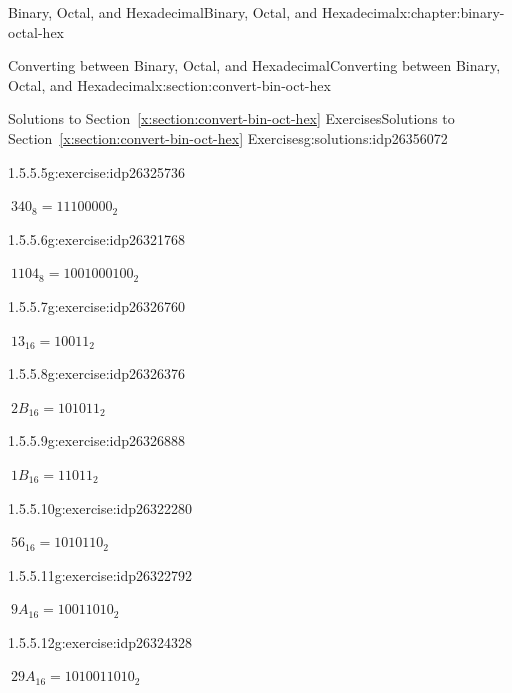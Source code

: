 \documentclass[twoside,10pt,]{book}
\newcommand{\xreffont}{\relax}
\numberwithin{equation}{section}
\begin{document}
\begin{chapterptx}{Binary, Octal, and Hexadecimal}{}{Binary, Octal, and Hexadecimal}{}{}{x:chapter:binary-octal-hex}
\begin{sectionptx}{Converting between Binary, Octal, and Hexadecimal}{}{Converting between Binary, Octal, and Hexadecimal}{}{}{x:section:convert-bin-oct-hex}
\begin{solutions-subsection}{Solutions to Section~{\xreffont\ref*{x:section:convert-bin-oct-hex}} Exercises}{}{Solutions to Section~{\xreffont\ref*{x:section:convert-bin-oct-hex}} Exercises}{}{}{g:solutions:idp26356072}
\begin{exercisegroup}
\begin{divisionsolutioneg}{1.5.5.5}{}{g:exercise:idp26325736}
\par\smallskip%
\noindent\hypertarget{g:solution:idp26320104-main}{}\(\ 340_8=11100000_2\)\end{divisionsolutioneg}%
\begin{divisionsolutioneg}{1.5.5.6}{}{g:exercise:idp26321768}%
\par\smallskip%
\noindent\hypertarget{g:solution:idp26325480-main}{}\(\ 1104_8=1001000100_2\)\end{divisionsolutioneg}%
\end{exercisegroup}
\par\medskip\noindent
\begin{exercisegroup}
\begin{divisionsolutioneg}{1.5.5.7}{}{g:exercise:idp26326760}%
\par\smallskip%
\noindent\hypertarget{g:solution:idp26321896-main}{}\(\ 13_{16}=10011_2\)\end{divisionsolutioneg}%
\begin{divisionsolutioneg}{1.5.5.8}{}{g:exercise:idp26326376}%
\par\smallskip%
\noindent\hypertarget{g:solution:idp26321512-main}{}\(\ 2B_{16}=101011_2\)\end{divisionsolutioneg}%
\begin{divisionsolutioneg}{1.5.5.9}{}{g:exercise:idp26326888}%
\par\smallskip%
\noindent\hypertarget{g:solution:idp26326120-main}{}\(\ 1B_{16}=11011_2\)\end{divisionsolutioneg}%
\begin{divisionsolutioneg}{1.5.5.10}{}{g:exercise:idp26322280}%
\par\smallskip%
\noindent\hypertarget{g:solution:idp26323560-main}{}\(\ 56_{16}=1010110_2\)\end{divisionsolutioneg}%
\begin{divisionsolutioneg}{1.5.5.11}{}{g:exercise:idp26322792}%
\par\smallskip%
\noindent\hypertarget{g:solution:idp26323944-main}{}\(\ 9A_{16}=10011010_2\)\end{divisionsolutioneg}%
\begin{divisionsolutioneg}{1.5.5.12}{}{g:exercise:idp26324328}%
\par\smallskip%
\noindent\hypertarget{g:solution:idp26324968-main}{}\(\ 29A_{16}=1010011010_2\)\end{divisionsolutioneg}%
\end{exercisegroup}
\par\medskip\noindent

\end{solutions-subsection}
\end{sectionptx}
\end{chapterptx}
\end{document}
